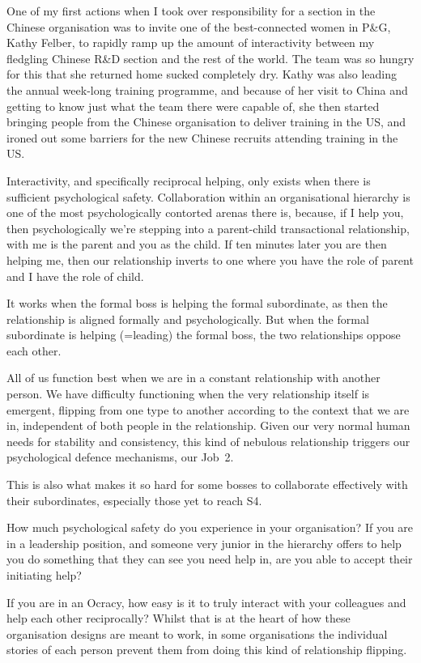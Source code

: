 One of my first actions when I took over responsibility for a section in the Chinese organisation was to invite one of the best-connected women in P\&G, Kathy Felber, to rapidly ramp up the amount of interactivity between my fledgling Chinese R\&D section and the rest of the world. The team was so hungry for this that she returned home sucked completely dry. Kathy was also leading the annual week-long training programme, and because of her visit to China and getting to know just what the team there were capable of, she then started bringing people from the Chinese organisation to deliver training in the US, and ironed out some barriers for the new Chinese recruits attending training in the US.


Interactivity, and specifically reciprocal helping, only exists when there is sufficient psychological safety. Collaboration within an organisational hierarchy is one of the most psychologically contorted arenas there is, because, if I help you, then psychologically we're stepping into a parent-child transactional relationship, with me is the parent and you as the child. If ten minutes later you are then helping me, then our relationship inverts to one where you have the role of parent and I have the role of child.


It works when the formal boss is helping the formal subordinate, as then the relationship is aligned formally and psychologically. But when the formal subordinate is helping (=leading) the formal boss, the two relationships oppose each other.


All of us function best when we are in a constant relationship with another person. We have difficulty functioning when the very relationship itself is emergent, flipping from one type to another according to the context that we are in, independent of both people in the relationship. Given our very normal human needs for stability and consistency, this kind of nebulous relationship triggers our psychological defence mechanisms, our Job~2.


This is also what makes it so hard for some bosses to collaborate effectively with their subordinates, especially those yet to reach S4.


How much psychological safety do you experience in your organisation? If you are in a leadership position, and someone very junior in the hierarchy offers to help you do something that they can see you need help in, are you able to accept their initiating help? 


If you are in an Ocracy, how easy is it to truly interact with your colleagues and help each other reciprocally? Whilst that is at the heart of how these organisation designs are meant to work, in some organisations the individual stories of each person prevent them from doing this kind of relationship flipping.


